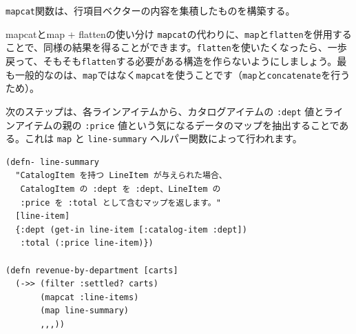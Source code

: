 \texttt{mapcat}関数は、行項目ベクターの内容を集積したものを構築する。

\begin{itembox}[l]{mapcatとmap + flattenの使い分け}
\texttt{mapcat}の代わりに、\texttt{map}と\texttt{flatten}を併用することで、同様の結果を得ることができます。\texttt{flatten}を使いたくなったら、一歩戻って、そもそも\texttt{flatten}する必要がある構造を作らないようにしましょう。最も一般的なのは、\texttt{map}ではなく\texttt{mapcat}を使うことです（\texttt{map}と\texttt{concatenate}を行うため）。
\end{itembox}

次のステップは、各ラインアイテムから、カタログアイテムの \texttt{:dept} 値とラインアイテムの親の \texttt{:price} 値という気になるデータのマップを抽出することである。これは \texttt{map} と \texttt{line-summary} ヘルパー関数によって行われます。



\begin{lstlisting}[numbers=none]
(defn- line-summary
  "CatalogItem を持つ LineItem が与えられた場合、
   CatalogItem の :dept を :dept、LineItem の 
   :price を :total として含むマップを返します。"
  [line-item]
  {:dept (get-in line-item [:catalog-item :dept])
   :total (:price line-item)})

(defn revenue-by-department [carts]
  (->> (filter :settled? carts)
       (mapcat :line-items)
       (map line-summary)
       ,,,))
\end{lstlisting}

